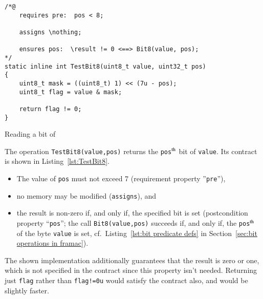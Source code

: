 \begin{listing}[hbt]
\begin{minipage}{0.99\textwidth}
\begin{lstlisting}[style=acsl-block]
/*@
    requires pre:  pos < 8;

    assigns \nothing;

    ensures pos:  \result != 0 <==> Bit8(value, pos);
*/
static inline int TestBit8(uint8_t value, uint32_t pos)
{
    uint8_t mask = ((uint8_t) 1) << (7u - pos);
    uint8_t flag = value & mask;

    return flag != 0;
}
\end{lstlisting}
\end{minipage}
\caption{\label{lst:TestBit8}Reading a bit of }
\end{listing}










The operation \lstinline{TestBit8(value,pos)} returns the
\lstinline{pos}$^{\mbox{\scriptsize th}}$
bit of \lstinline{value}.
%
Its contract is shown in Listing~\ref{lst:TestBit8}.
%
\begin{itemize}
\item The value of \lstinline{pos} must not exceed 7 
	(requirement property ''\lstinline{pre}''),
\item no memory may be modified (\lstinline{assigns}), and 
\item the result is non-zero if, and only
	if, the specified bit is set (postcondition property
	``\lstinline{pos}''; the call \lstinline{Bit8(value,pos)} succeeds 
	if, and only if, the \lstinline{pos}$^{\mbox{\scriptsize th}}$ of
	the byte \lstinline{value} is set, 
	cf.\ Listing~\ref{lst:bit predicate defs} in
	Section~\ref{sec:bit operations in framac}).
\end{itemize}
%
The shown implementation additionally guarantees that the result is
zero or one, which
is not specified in the contract since this property isn't needed.
%
Returning just \lstinline{flag} rather than \lstinline{flag!=0u}
would satisfy the
contract also, and would be slightly faster.






